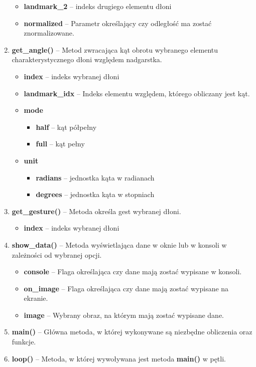 \begin{enumerate}
\begin{itemize}
        \item \textbf{landmark\_2} -- indeks drugiego elementu dłoni
        \item \textbf{normalized} -- Parametr określający czy odległość ma zostać znormalizowane.
    \end{itemize}
    \item \textbf{get\_angle()} -- Metod zwracająca kąt obrotu wybranego elementu charakterystycznego dłoni względem nadgarstka. 
    \begin{itemize}
        \item \textbf{index} -- indeks wybranej dłoni 
        \item \textbf{landmark\_idx} -- Indeks elementu względem, którego obliczany jest kąt.
        \item \textbf{mode}
        \begin{itemize}
            \item \textbf{half} -- kąt półpełny
            \item \textbf{full} -- kąt pełny
        \end{itemize}
        \item \textbf{unit}
        \begin{itemize}
            \item \textbf{radians} -- jednostka kąta w radianach
            \item \textbf{degrees} -- jednostka kąta w stopniach
        \end{itemize}
    \end{itemize}
    \item \textbf{get\_gesture()} -- Metoda określa gest wybranej dłoni. 
    \begin{itemize}
        \item \textbf{index} -- indeks wybranej dłoni
    \end{itemize}
    \newpage
    \item \textbf{show\_data()} -- Metoda wyświetlająca dane w oknie lub w konsoli w zależności od wybranej opcji. 
    \begin{itemize}
        \item \textbf{console} -- Flaga określająca czy dane mają zostać wypisane w konsoli.
        \item \textbf{on\_image} -- Flaga określająca czy dane mają zostać wypisane na ekranie. 
        \item \textbf{image} -- Wybrany obraz, na którym mają zostać wypisane dane.
    \end{itemize}
    \item \textbf{main()} -- Główna metoda, w której wykonywane są niezbędne obliczenia oraz funkcje. 
    \item \textbf{loop()} -- Metoda, w której wywoływana jest metoda \textbf{main()} w pętli. 
\end{enumerate}

